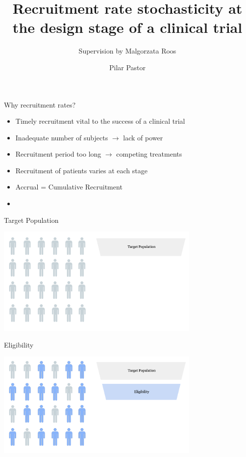 \documentclass[english]{beamer}\usepackage[]{graphicx}\usepackage[]{xcolor}
\title[Recruitment rate stochasticity at the design
stage of a clinical trial]{Recruitment rate stochasticity at the design
stage of a clinical trial}
\subtitle{Supervision by Malgorzata Roos}
\author{Pilar Pastor}
\begin{document}
\maketitle


\begin{frame}{Why recruitment rates?}

\begin{itemize}
\item Timely recruitment vital to the success of a clinical trial
\item Inadequate number of subjects $\rightarrow$ lack of power
\item Recruitment period too long $\rightarrow$ competing treatments
\item Recruitment of patients varies at each stage 
\item Accrual = Cumulative Recruitment
\item \cite{carter2004application}
\end{itemize}


\end{frame}


\begin{frame}{Target Population}

\includegraphics[width=100mm,scale=1]{targetpop.png}

\end{frame}

\begin{frame}{Eligibility}

\includegraphics[width=100mm,scale=1]{eligibility.png}

\end{frame}
\end{document}
